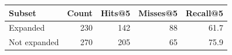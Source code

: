 \begin{tabular}{lrrrr}
\toprule
Subset & Count & Hits@5 & Misses@5 & Recall@5
\\
\midrule
Expanded & 230 & 142 & 88 & 61.7 \\
Not expanded & 270 & 205 & 65 & 75.9 \\
\bottomrule
\end{tabular}
